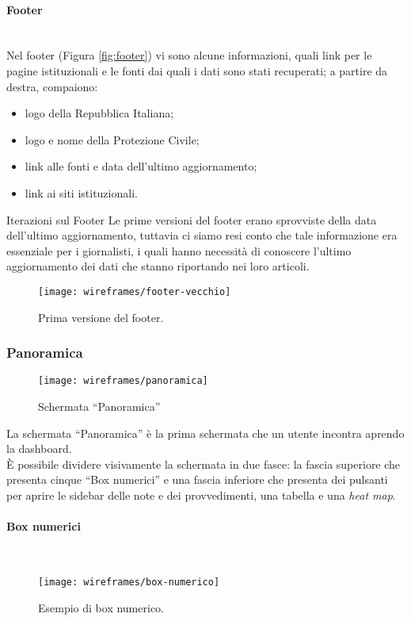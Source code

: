 \documentclass[../../../main.tex]{subfiles}
\begin{document}
\paragraph{Footer}\mbox{}\\
Nel footer (Figura \ref{fig:footer}) vi sono alcune informazioni, quali link per le pagine istituzionali e le fonti dai quali i dati sono stati recuperati; a partire da destra, compaiono:
\begin{itemize}
    \item logo della Repubblica Italiana;
    \item logo e nome della Protezione Civile;
    \item link alle fonti e data dell'ultimo aggiornamento;
    \item link ai siti istituzionali.
\end{itemize}

\begin{bclogo}{Iterazioni sul Footer}
    Le prime versioni del footer erano sprovviste della data dell'ultimo aggiornamento, tuttavia ci siamo resi conto che tale informazione era essenziale per i giornalisti, i quali hanno necessità di conoscere l'ultimo aggiornamento dei dati che stanno riportando nei loro articoli.
\begin{figure}[H]
    \centering
    \texttt{[image: wireframes/footer-vecchio]}
    \caption{Prima versione del footer.}
    \label{fig:footer-vecchio}
\end{figure}
\end{bclogo}


\subsubsection{Panoramica}\label{ss:panoramica}
\begin{figure}[H]
    \centering
    \texttt{[image: wireframes/panoramica]}
    \caption{Schermata ``Panoramica''}
    \label{fig:panoramica}
\end{figure}
La schermata ``Panoramica'' è la prima schermata che un utente incontra aprendo la dashboard.\\
\`E possibile dividere visivamente la schermata in due fasce: la fascia superiore che presenta cinque ``Box numerici'' e una fascia inferiore che presenta dei pulsanti per aprire le sidebar delle note e dei provvedimenti, una tabella e una \textit{heat map}.\\

\paragraph{Box numerici}\mbox{}\\
\begin{figure}[H]
    \centering
    \texttt{[image: wireframes/box-numerico]}
    \caption{Esempio di box numerico.}
    \label{fig:box-numerico}
\end{figure}
\end{document}
